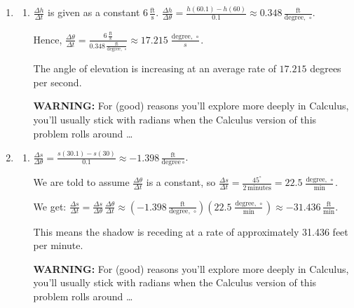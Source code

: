 \documentclass{ximera}
\begin{document}
\begin{enumerate}
\setcounter{enumi}{\value{HW}}
\item \begin{enumerate} \addtocounter{enumii}{1}

\item  $\frac{\Delta h}{\Delta t}$ is given as a constant $6 \, \frac{\text{ft}}{\text{s}}$. $\frac{\Delta h}{\Delta \theta} = \frac{h(60.1) - h(60)}{0.1} \approx 0.348 \, \frac{\text{ft}}{\text{degree,  } \,  \circ}$.  

Hence, $\frac{\Delta \theta}{\Delta t} = \frac{ 6 \, \frac{\text{ft}}{\text{s}}   }{ 0.348 \, \frac{\text{ft}}{\text{degree,  } \, \circ}} \approx 17.215 \, \frac{ \text{degree,  } \, \circ}{s}$.  

 

The angle of elevation is increasing at an average rate of $17.215$ degrees  per second.  

 

\textbf{WARNING:} For (good) reasons you'll explore more deeply in Calculus, you'll usually stick with radians when the Calculus version of this problem rolls around \ldots  

\end{enumerate}


\item  \begin{enumerate} \addtocounter{enumii}{1}

\item   $\frac{\Delta s}{\Delta \theta} = \frac{s(30.1) - s(30)}{0.1} \approx -1.398 \, \frac{\text{ft}}{\text{degree} \,  \circ}$.  

 

We are told to assume $\frac{\Delta \theta }{\Delta t}$ is a constant, so $\frac{\Delta s}{\Delta t} = \frac{45^{\circ}}{2 \, \text{minutes}} = 22.5 \, \frac{\text{degree,  } \, \circ}{\text{min}}$.

 

We get:  $\frac{\Delta s}{\Delta t} = \frac{\Delta s}{\Delta \theta} \, \frac{\Delta \theta }{\Delta t} \approx \left(-1.398 \, \frac{\text{ft}}{\text{degree,  } \,  \circ} \right) \left(  22.5 \, \frac{\text{degree,  } \, \circ}{\text{min}} \right) \approx -31.436 \, \frac{\text{ft}}{\text{min}}$.

 

This means the shadow is receding at a rate of approximately 31.436 feet per minute.

 

\textbf{WARNING:} For (good) reasons you'll explore more deeply in Calculus, you'll usually stick with radians when the Calculus version of this problem rolls around \ldots  

\end{enumerate}


\setcounter{HW}{\value{enumi}}
\end{enumerate}
\end{document}

